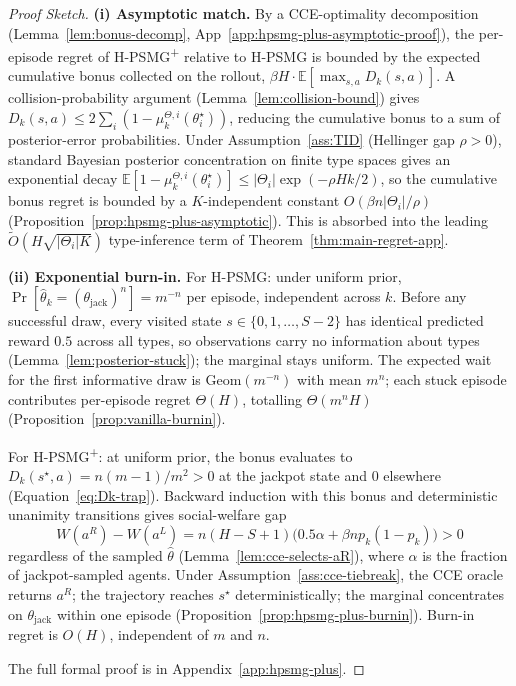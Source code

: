 \begin{proof}[Proof Sketch]
\textbf{(i) Asymptotic match.} By a CCE-optimality decomposition (Lemma~\ref{lem:bonus-decomp}, App~\ref{app:hpsmg-plus-asymptotic-proof}), the per-episode regret of H-PSMG\textsuperscript{+} relative to H-PSMG is bounded by the expected cumulative bonus collected on the rollout, $\beta H \cdot \mathbb{E}[\max_{s,a} D_k(s, a)]$. A collision-probability argument (Lemma~\ref{lem:collision-bound}) gives $D_k(s, a) \leq 2 \sum_i (1 - \mu_k^{\Theta, i}(\theta_i^\star))$, reducing the cumulative bonus to a sum of posterior-error probabilities. Under Assumption~\ref{ass:TID} (Hellinger gap $\rho > 0$), standard Bayesian posterior concentration on finite type spaces \citep{ghosal2007convergence} gives an exponential decay $\mathbb{E}[1 - \mu_k^{\Theta, i}(\theta_i^\star)] \leq |\Theta_i| \exp(-\rho H k / 2)$, so the cumulative bonus regret is bounded by a $K$-independent constant $O(\beta n |\Theta_i| / \rho)$ (Proposition~\ref{prop:hpsmg-plus-asymptotic}). This is absorbed into the leading $\tilde O(H\sqrt{|\Theta_i| K})$ type-inference term of Theorem~\ref{thm:main-regret-app}.

\textbf{(ii) Exponential burn-in.} For H-PSMG: under uniform prior, $\Pr[\hat\theta_k = (\theta_{\mathrm{jack}})^n] = m^{-n}$ per episode, independent across $k$. Before any successful draw, every visited state $s \in \{0, 1, \ldots, S-2\}$ has identical predicted reward $0.5$ across all types, so observations carry no information about types (Lemma~\ref{lem:posterior-stuck}); the marginal stays uniform. The expected wait for the first informative draw is $\mathrm{Geom}(m^{-n})$ with mean $m^n$; each stuck episode contributes per-episode regret $\Theta(H)$, totalling $\Theta(m^n H)$ (Proposition~\ref{prop:vanilla-burnin}).

For H-PSMG\textsuperscript{+}: at uniform prior, the bonus evaluates to $D_k(s^\star, a) = n(m-1)/m^2 > 0$ at the jackpot state and $0$ elsewhere (Equation~\ref{eq:Dk-trap}). Backward induction with this bonus and deterministic unanimity transitions gives social-welfare gap
\begin{equation*}
W(a^R) - W(a^L) = n(H - S + 1)\big(0.5\alpha + \beta n p_k(1-p_k)\big) > 0
\end{equation*}
regardless of the sampled $\hat\theta$ (Lemma~\ref{lem:cce-selects-aR}), where $\alpha$ is the fraction of jackpot-sampled agents. Under Assumption~\ref{ass:cce-tiebreak}, the CCE oracle returns $a^R$; the trajectory reaches $s^\star$ deterministically; the marginal concentrates on $\theta_{\mathrm{jack}}$ within one episode (Proposition~\ref{prop:hpsmg-plus-burnin}). Burn-in regret is $O(H)$, independent of $m$ and $n$.

The full formal proof is in Appendix~\ref{app:hpsmg-plus}.
\end{proof}

